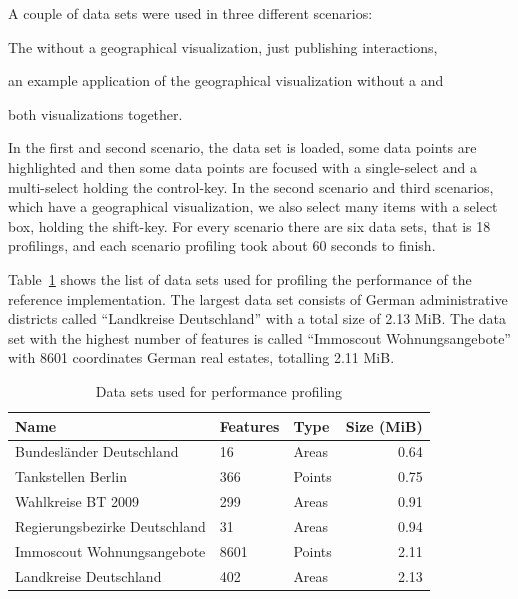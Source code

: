A couple of data sets were used in three different scenarios:
\begin{enumerate*}[label=(\arabic*)]
  \item The \tmap{} without a geographical visualization, just publishing interactions,
  \item an example application of the geographical visualization without a \tmap{} and
  \item both visualizations together.
\end{enumerate*}

In the first and second scenario, the data set is loaded, some data points are highlighted and then some data points are focused with a single-select and a multi-select holding the control-key.
In the second scenario and third scenarios, which have a geographical visualization, we also select many items with a select box, holding the shift-key.
For every scenario there are six data sets, that is 18 profilings, and each scenario profiling took about 60 seconds to finish.

Table~\ref{tab:evaluation:performance:data-sets} shows the list of data sets used for profiling the performance of the reference implementation.
The largest data set consists of German administrative districts called ``Landkreise Deutschland'' with a total size of 2.13 MiB.
The data set with the highest number of features is called ``Immoscout Wohnungsangebote'' with 8601 coordinates German real estates, totalling 2.11 MiB.

\begin{table}[ht]
  \centering
  \begin{tabular}{lllr}
    Name & Features & Type & Size (MiB) \\
    \hline
    Bundesländer Deutschland      & 16   & Areas  & 0.64 \\
    Tankstellen Berlin            & 366  & Points & 0.75 \\
    Wahlkreise BT 2009            & 299  & Areas  & 0.91 \\
    Regierungsbezirke Deutschland & 31   & Areas  & 0.94 \\
    Immoscout Wohnungsangebote    & 8601 & Points & 2.11 \\
    Landkreise Deutschland        & 402  & Areas  & 2.13 \\
  \end{tabular}
  \caption{Data sets used for performance profiling}%
  \label{tab:evaluation:performance:data-sets}
\end{table}


